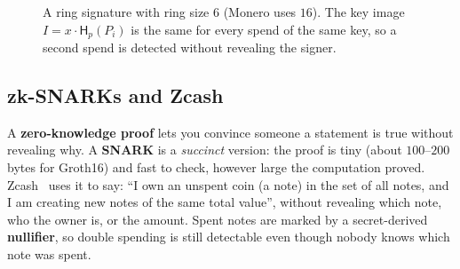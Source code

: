 \documentclass[11pt,a4paper]{article}
\newenvironment{plainenglish}{\par\smallskip}{\par\smallskip}
\theoremstyle{definition}
\theoremstyle{plain}
\theoremstyle{remark}
\newcommand{\Hash}{\mathsf{H}}
\begin{document}
\begin{figure}[htbp]
\centering
{}
\caption{A ring signature with ring size $6$ (Monero uses $16$). The key image $I=x\cdot\Hash_p(P_i)$ is the same for every spend of the same key, so a second spend is detected without revealing the signer.}
\end{figure}

\subsection{zk-SNARKs and Zcash}

\begin{plainenglish}
A \textbf{zero-knowledge proof} lets you convince someone a statement is true without revealing why. A \textbf{SNARK} is a \emph{succinct} version: the proof is tiny (about $100$--$200$ bytes for Groth16) and fast to check, however large the computation proved.
Zcash~\cite{BCGGMTV14} uses it to say: ``I own an unspent coin (a note) in the set of all notes, and I am creating new notes of the same total value'', without revealing which note, who the owner is, or the amount. Spent notes are marked by a secret-derived \textbf{nullifier},
so double spending is still detectable even though nobody knows which note was spent.
\end{plainenglish}
\end{document}
